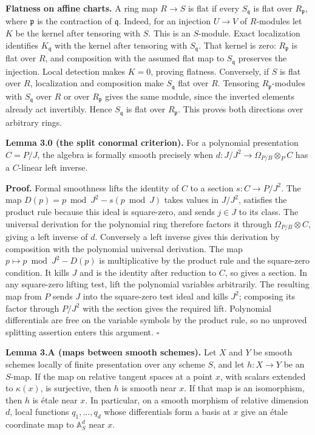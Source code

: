 \documentclass[11pt,a4paper,openany]{report}
\begin{document}
\textbf{Flatness on affine charts.} A ring map \(R\to S\) is flat if every \(S_{\mathfrak q}\) is flat over \(R_{\mathfrak p}\), where \(\mathfrak p\) is the contraction of \(\mathfrak q\). Indeed, for an injection \(U\to V\) of \(R\)-modules let \(K\) be the kernel after tensoring with \(S\). This is an \(S\)-module. Exact localization identifies \(K_{\mathfrak q}\) with the kernel after tensoring with \(S_{\mathfrak q}\). That kernel is zero: \(R_{\mathfrak p}\) is flat over \(R\), and composition with the assumed flat map to \(S_{\mathfrak q}\) preserves the injection. Local detection makes \(K=0\), proving flatness. Conversely, if \(S\) is flat over \(R\), localization and composition make \(S_{\mathfrak q}\) flat over \(R\). Tensoring \(R_{\mathfrak p}\)-modules with \(S_{\mathfrak q}\) over \(R\) or over \(R_{\mathfrak p}\) gives the same module, since the inverted elements already act invertibly. Hence \(S_{\mathfrak q}\) is flat over \(R_{\mathfrak p}\). This proves both directions over arbitrary rings.

\textbf{Lemma 3.0 (the split conormal criterion).} For a polynomial presentation \(C=P/J\), the algebra is formally smooth precisely when \(d:J/J^2\to\Omega_{P/B}\otimes_PC\) has a \(C\)-linear left inverse.

\textbf{Proof.} Formal smoothness lifts the identity of \(C\) to a section \(s:C\to P/J^2\). The map \(D(p)=p\bmod J^2-s(p\bmod J)\) takes values in \(J/J^2\), satisfies the product rule because this ideal is square-zero, and sends \(j\in J\) to its class. The universal derivation for the polynomial ring therefore factors it through \(\Omega_{P/B}\otimes C\), giving a left inverse of \(d\). Conversely a left inverse gives this derivation by composition with the polynomial universal derivation. The map \(p\mapsto p\bmod J^2-D(p)\) is multiplicative by the product rule and the square-zero condition. It kills \(J\) and is the identity after reduction to \(C\), so gives a section. In any square-zero lifting test, lift the polynomial variables arbitrarily. The resulting map from \(P\) sends \(J\) into the square-zero test ideal and kills \(J^2\); composing its factor through \(P/J^2\) with the section gives the required lift. Polynomial differentials are free on the variable symbols by the product rule, so no unproved splitting assertion enters this argument. \(\square\)

\label{AG-RG-S02-smooth-map-differential}

\textbf{Lemma 3.A (maps between smooth schemes).} Let \(X\) and \(Y\) be smooth schemes locally of finite presentation over any scheme \(S\), and let \(h:X\to Y\) be an \(S\)-map. If the map on relative tangent spaces at a point \(x\), with scalars extended to \(\kappa(x)\), is surjective, then \(h\) is smooth near \(x\). If that map is an isomorphism, then \(h\) is étale near \(x\). In particular, on a smooth morphism of relative dimension \(d\), local functions \(q_1,\ldots,q_d\) whose differentials form a basis at \(x\) give an étale coordinate map to \(\mathbb A^d_S\) near \(x\).
\end{document}
